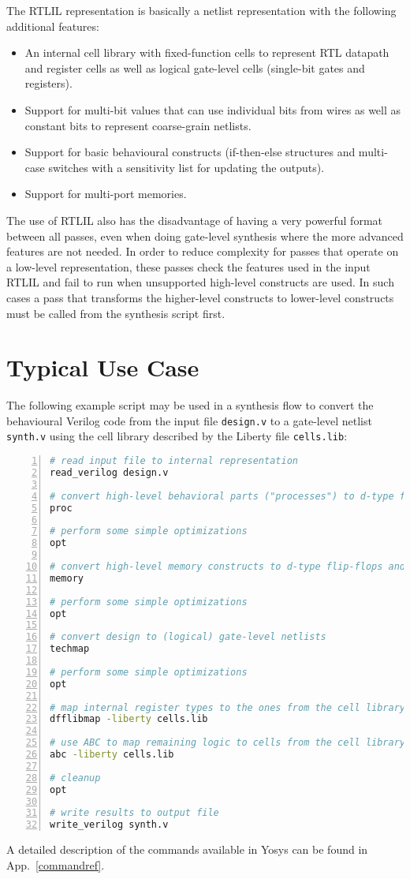 The RTLIL representation is basically a netlist representation with the following additional features:

\begin{itemize}
\item An internal cell library with fixed-function cells to represent RTL datapath and register cells as well
as logical gate-level cells (single-bit gates and registers).
\item Support for multi-bit values that can use individual bits from wires as well as constant bits to
represent coarse-grain netlists.
\item Support for basic behavioural constructs (if-then-else structures and multi-case switches with
a sensitivity list for updating the outputs).
\item Support for multi-port memories.
\end{itemize}

The use of RTLIL also has the disadvantage of having a very powerful format
between all passes, even when doing gate-level synthesis where the more
advanced features are not needed. In order to reduce complexity for passes that
operate on a low-level representation, these passes check the features used in
the input RTLIL and fail to run when unsupported high-level constructs are
used. In such cases a pass that transforms the higher-level constructs to
lower-level constructs must be called from the synthesis script first.

\section{Typical Use Case}
\label{sec:typusecase}

The following example script may be used in a synthesis flow to convert the behavioural Verilog code
from the input file {\tt design.v} to a gate-level netlist {\tt synth.v} using the cell library
described by the Liberty file  {\tt cells.lib}:

\begin{lstlisting}[language=sh,numbers=left,frame=single]
# read input file to internal representation
read_verilog design.v

# convert high-level behavioral parts ("processes") to d-type flip-flops and muxes
proc

# perform some simple optimizations
opt

# convert high-level memory constructs to d-type flip-flops and multiplexers
memory

# perform some simple optimizations
opt

# convert design to (logical) gate-level netlists
techmap

# perform some simple optimizations
opt

# map internal register types to the ones from the cell library
dfflibmap -liberty cells.lib

# use ABC to map remaining logic to cells from the cell library
abc -liberty cells.lib

# cleanup
opt

# write results to output file
write_verilog synth.v
\end{lstlisting}

A detailed description of the commands available in Yosys can be found in App.~\ref{commandref}.

